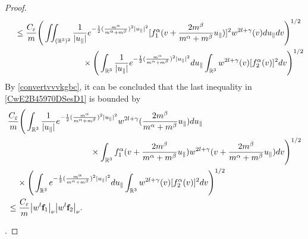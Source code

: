 \documentclass[reqno]{amsart}
\numberwithin{equation}{section}
\numberwithin{equation}{section}
\begin{document}
\begin{proof}
\begin{align}
			&\hspace{0.4cm}\leq \frac{C_\varepsilon}{m} \Bigg(\iint_{(\mathbb{R}^3)^2}\frac{1}{|u_{\parallel}|}e^{-\frac{1}{2}(\frac{m^\alpha}{m^\alpha+m^\beta})^2|u_{\parallel}|^2}[f^\alpha_1(v + \frac{2m^{\beta}}{m^{\alpha}+m^{\beta}}u_{\parallel})]^{2} w^{2l+\gamma}(v)du_{\parallel}dv\Bigg)^{1/2}\label{CwE2B45970DSesD1}\\
			&\hspace{3.3cm}\times  \Bigg(\int_{\mathbb{R}^3}\frac{1}{|u_{\parallel}|}e^{-\frac{1}{2}(\frac{m^\alpha}{m^\alpha+m^\beta})^2|u_{\parallel}|^2} du_{\parallel}\int_{\mathbb{R}^3}w^{2l+\gamma}(v)[f^\alpha_2(v)]^2dv\Bigg)^{1/2}\notag
		\end{align}
		By \eqref{convertvvvkgbc}, it can be concluded that the last inequality in \eqref{CwE2B45970DSesD1} is bounded by
		\begin{align*}
				& \frac{C_\varepsilon}{m} \Bigg(\int_{\mathbb{R}^3}\frac{1}{|u_{\parallel}|}e^{-\frac{1}{2}(\frac{m^\alpha}{m^\alpha+m^\beta})^2|u_{\parallel}|^2}w^{2l+\gamma}( \frac{2m^{\beta}}{m^{\alpha}+m^{\beta}}u_{\parallel})du_{\parallel}\\
				&\hspace{3.5cm}\times\int_{\mathbb{R}^3}f^\alpha_1(v + \frac{2m^{\beta}}{m^{\alpha}+m^{\beta}}u_{\parallel}) w^{2l+\gamma}(v + \frac{2m^{\beta}}{m^{\alpha}+m^{\beta}}u_{\parallel})dv\Bigg)^{1/2}\\
				&\hspace{0.4cm}\times  \Bigg(\int_{\mathbb{R}^3}e^{-\frac{1}{2}(\frac{m^\alpha}{m^\alpha+m^\beta})^2|u_{\parallel}|^2} du_{\parallel}\int_{\mathbb{R}^3}w^{2l+\gamma}(v)[f^\alpha_2(v)]^2dv\Bigg)^{1/2}\\
				&\leq \frac{C_\varepsilon}{m} \big|w^{l}\mathbf{f}_1\big|_\nu \big|w^{l} \mathbf{f}_2\big|_\nu.
		\end{align*}
		
		
		
		.
		

\end{proof}
\end{document}
